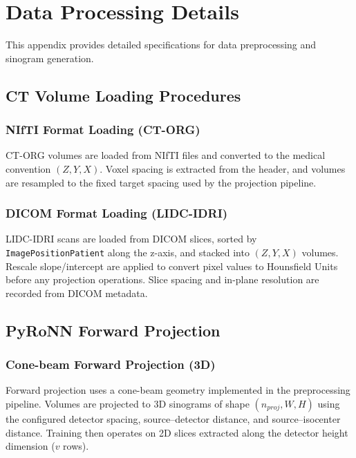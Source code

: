 \chapter{Data Processing Details}
\label{app:data_processing}

This appendix provides detailed specifications for data preprocessing and sinogram generation.

\section{CT Volume Loading Procedures}

\subsection{NIfTI Format Loading (CT-ORG)}

CT-ORG volumes are loaded from NIfTI files and converted to the medical convention $(Z, Y, X)$. Voxel spacing is extracted from the header, and volumes are resampled to the fixed target spacing used by the projection pipeline.

\subsection{DICOM Format Loading (LIDC-IDRI)}

LIDC-IDRI scans are loaded from DICOM slices, sorted by \texttt{ImagePositionPatient} along the z-axis, and stacked into $(Z, Y, X)$ volumes. Rescale slope/intercept are applied to convert pixel values to Hounsfield Units before any projection operations. Slice spacing and in-plane resolution are recorded from DICOM metadata.

\section{PyRoNN Forward Projection}

\subsection{Cone-beam Forward Projection (3D)}

Forward projection uses a cone-beam geometry implemented in the preprocessing pipeline. Volumes are projected to 3D sinograms of shape $(n_{proj}, W, H)$ using the configured detector spacing, source--detector distance, and source--isocenter distance. Training then operates on 2D slices extracted along the detector height dimension ($v$ rows).

